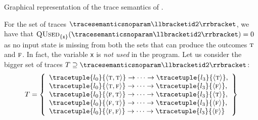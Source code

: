 \begin{example}
\begin{marginfigure}
\caption{Graphical representation of the trace semantics of .}
\end{marginfigure}
For the set of traces $\tracesemanticsnoparam\semanticsof{\texttt{id2}}$, we have that $\qusedname_{\{\texttt{x} \}}(\tracesemanticsnoparam\semanticsof{\texttt{id2}})=0$ as no input state is missing from both the sets that can produce the outcomes $\textsc{t}$ and $\textsc{f}$. In fact, the variable \texttt{x} is \emph{not used} in the program.
Let us consider the bigger set of traces $\defsetoftraces \supseteq \tracesemanticsnoparam\semanticsof{\texttt{id2}}$:
\begin{align*}
  \defsetoftraces
  =
  \left\{
    \begin{array}{l}
      \tracetuple{\locinit}{\langle \true, \true\rangle}\tracearrow\tracetuple{\loc{3}}{\langle \true\rangle}, \\
      \tracetuple{\locinit}{\langle \true, \false\rangle}\tracearrow\tracetuple{\loc{3}}{\langle \false\rangle}, \\
      \tracetuple{\locinit}{\langle \false, \true\rangle}\tracearrow\tracetuple{\loc{3}}{\langle \true\rangle}, \\
      \tracetuple{\locinit}{\langle \false, \true\rangle}\tracearrow\tracetuple{\loc{3}}{\langle \false\rangle}, \\
      \tracetuple{\locinit}{\langle \false, \false\rangle}\tracearrow\tracetuple{\loc{3}}{\langle \false\rangle}
    \end{array}
    \right\}
\end{align*}
\begin{marginfigure}[*-8]
\end{marginfigure}
\end{example}
